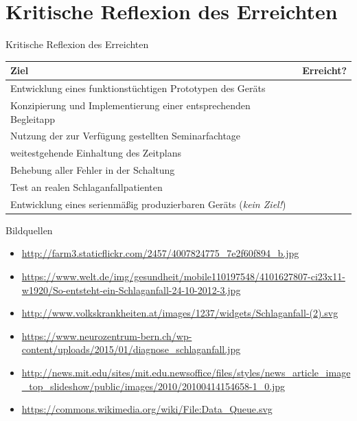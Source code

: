 \documentclass[hyphens]{beamer}
\newcommand{\xmark}{\ding{55}}
\begin{document}
 \section*{Kritische Reflexion des Erreichten}
 \begin{frame}{Kritische Reflexion des Erreichten}
 	\begin{table}
 		\begin{tabularx}{\textwidth}{|Z|c|}
 			\hline
 			\textbf{Ziel} & \textbf{Erreicht?} \\
 			\hline
 			\hline
 			Entwicklung eines funktionstüchtigen Prototypen des Geräts & \checkmark \\
 			\hline
 			Konzipierung und Implementierung einer entsprechenden Begleitapp & \checkmark \\
 			\hline
 			Nutzung der zur Verfügung gestellten Seminarfachtage  & \checkmark \\
 			\hline
 			weitestgehende Einhaltung des Zeitplans & \checkmark \\
 			\hline
 			Behebung aller Fehler in der Schaltung & \checkmark \\ 
 			\hline
 			Test an realen Schlaganfallpatienten & \xmark \\ 
 			\hline
 			Entwicklung eines serienmäßig produzierbaren Geräts (\emph{kein Ziel!}) & \xmark \\ 
 			\hline
 		\end{tabularx}
 	\end{table}
 \end{frame}

 \begin{frame}{Bildquellen}
 \begin{itemize}
 \item \small{\url{http://farm3.staticflickr.com/2457/4007824775_7e2f60f894_b.jpg}}
 \item \small{\url{https://www.welt.de/img/gesundheit/mobile110197548/4101627807-ci23x11-w1920/So-entsteht-ein-Schlaganfall-24-10-2012-3.jpg}}
 \item \small{\url{http://www.volkskrankheiten.at/images/1237/widgets/Schlaganfall-(2).svg}}
 \item  \small{\url{https://www.neurozentrum-bern.ch/wp-content/uploads/2015/01/diagnose_schlaganfall.jpg}}
 \item  \small{\url{http://news.mit.edu/sites/mit.edu.newsoffice/files/styles/news_article_image_top_slideshow/public/images/2010/20100414154658-1_0.jpg}}
 \item  \small{\url{https://commons.wikimedia.org/wiki/File:Data_Queue.svg}}
 \end{itemize}
 \end{frame}
\end{document}
